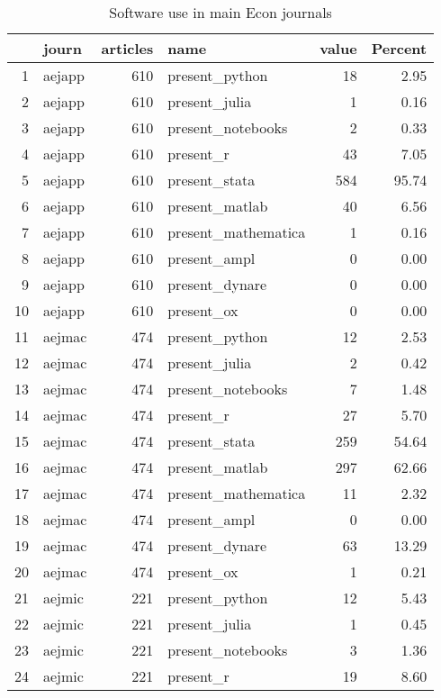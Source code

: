 \begin{table}[ht]
\centering
\caption{Software use in main Econ journals} 
\label{tab:software}
\begin{tabular}{rlrlrr}
  \hline
 & journ & articles & name & value & Percent \\ 
  \hline
1 & aejapp & 610 & present\_python &  18 & 2.95 \\ 
  2 & aejapp & 610 & present\_julia &   1 & 0.16 \\ 
  3 & aejapp & 610 & present\_notebooks &   2 & 0.33 \\ 
  4 & aejapp & 610 & present\_r &  43 & 7.05 \\ 
  5 & aejapp & 610 & present\_stata & 584 & 95.74 \\ 
  6 & aejapp & 610 & present\_matlab &  40 & 6.56 \\ 
  7 & aejapp & 610 & present\_mathematica &   1 & 0.16 \\ 
  8 & aejapp & 610 & present\_ampl &   0 & 0.00 \\ 
  9 & aejapp & 610 & present\_dynare &   0 & 0.00 \\ 
  10 & aejapp & 610 & present\_ox &   0 & 0.00 \\ 
  11 & aejmac & 474 & present\_python &  12 & 2.53 \\ 
  12 & aejmac & 474 & present\_julia &   2 & 0.42 \\ 
  13 & aejmac & 474 & present\_notebooks &   7 & 1.48 \\ 
  14 & aejmac & 474 & present\_r &  27 & 5.70 \\ 
  15 & aejmac & 474 & present\_stata & 259 & 54.64 \\ 
  16 & aejmac & 474 & present\_matlab & 297 & 62.66 \\ 
  17 & aejmac & 474 & present\_mathematica &  11 & 2.32 \\ 
  18 & aejmac & 474 & present\_ampl &   0 & 0.00 \\ 
  19 & aejmac & 474 & present\_dynare &  63 & 13.29 \\ 
  20 & aejmac & 474 & present\_ox &   1 & 0.21 \\ 
  21 & aejmic & 221 & present\_python &  12 & 5.43 \\ 
  22 & aejmic & 221 & present\_julia &   1 & 0.45 \\ 
  23 & aejmic & 221 & present\_notebooks &   3 & 1.36 \\ 
  24 & aejmic & 221 & present\_r &  19 & 8.60 \\ 

\end{tabular}
\end{table}
